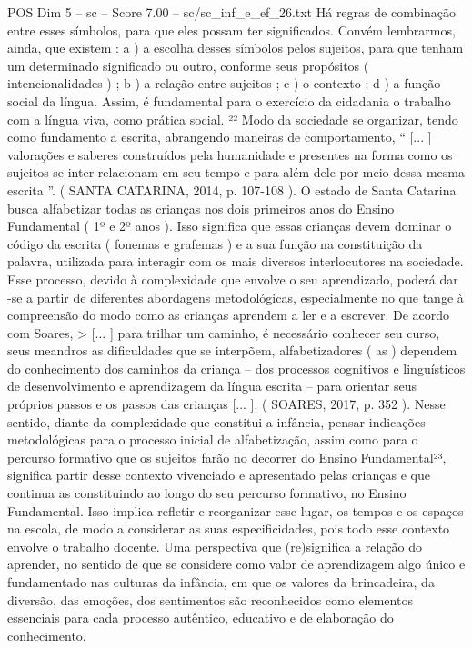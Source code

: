 \begin{textsample}{POS Dim 5 – sc – Score 7.00 – sc/sc\_inf\_e\_ef\_26.txt}
Há regras de combinação entre esses símbolos, para que eles possam ter significados.
Convém lembrarmos, ainda, que existem : a ) a escolha desses símbolos pelos sujeitos, para que tenham um determinado significado ou outro, conforme seus propósitos ( intencionalidades ) ; b ) a relação entre sujeitos ; c ) o contexto ; d ) a função social da língua.
Assim, é fundamental para o exercício da cidadania o trabalho com a língua viva, como prática social. ²² Modo da sociedade se organizar, tendo como fundamento a escrita, abrangendo maneiras de comportamento, “ [... ] valorações e saberes construídos pela humanidade e presentes na forma como os sujeitos se inter-relacionam em seu tempo e para além dele por meio dessa mesma escrita ”. ( SANTA CATARINA, 2014, p. 107-108 ).
O estado de Santa Catarina busca alfabetizar todas as crianças nos dois primeiros anos do Ensino Fundamental ( 1º e 2º anos ).
Isso significa que essas crianças devem dominar o código da escrita ( fonemas e grafemas ) e a sua função na constituição da palavra, utilizada para interagir com os mais diversos interlocutores na sociedade.
Esse processo, devido à complexidade que envolve o seu aprendizado, poderá dar -se a partir de diferentes abordagens metodológicas, especialmente no que tange à compreensão do modo como as crianças aprendem a ler e a escrever.
De acordo com Soares, > [... ] para trilhar um caminho, é necessário conhecer seu curso, seus meandros as dificuldades que se interpõem, alfabetizadores ( as ) dependem do conhecimento dos caminhos da criança – dos processos cognitivos e linguísticos de desenvolvimento e aprendizagem da língua escrita – para orientar seus próprios passos e os passos das crianças [... ]. ( SOARES, 2017, p. 352 ).
Nesse sentido, diante da complexidade que constitui a infância, pensar indicações metodológicas para o processo inicial de alfabetização, assim como para o percurso formativo que os sujeitos farão no decorrer do Ensino Fundamental²³, significa partir desse contexto vivenciado e apresentado pelas crianças e que continua as constituindo ao longo do seu percurso formativo, no Ensino Fundamental.
Isso implica refletir e reorganizar esse lugar, os tempos e os espaços na escola, de modo a considerar as suas especificidades, pois todo esse contexto envolve o trabalho docente.
Uma perspectiva que (re)significa a relação do aprender, no sentido de que se considere como valor de aprendizagem algo único e fundamentado nas culturas da infância, em que os valores da brincadeira, da diversão, das emoções, dos sentimentos são reconhecidos como elementos essenciais para cada processo autêntico, educativo e de elaboração do conhecimento.

\end{textsample}
